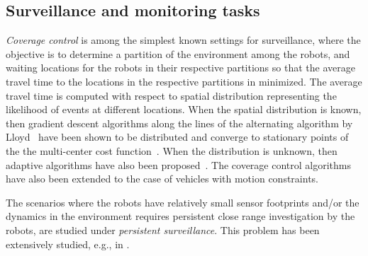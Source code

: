 \subsection{Surveillance and monitoring tasks}
\emph{Coverage control} is among the simplest known settings for surveillance, where the objective is to determine a partition of the environment among the robots, and waiting locations for the robots in their respective partitions so that the average travel time to the locations in the respective partitions in minimized. The average travel time is computed with respect to spatial distribution representing the likelihood of events at different locations. When the spatial distribution is known, then gradient descent algorithms along the lines of the alternating algorithm by Lloyd~\cite{Lloyd:82} have been shown to be distributed and converge to stationary points of the the multi-center cost function~\cite{cortes04}. When the distribution is unknown, then adaptive algorithms have also been proposed~\cite{Arsie.Savla.ea:TAC09,Schwager:2009fz}. The coverage control algorithms have also been extended to the case of vehicles with motion constraints. 

The scenarios where the robots have relatively small sensor footprints and/or the dynamics in the environment requires persistent close range investigation by the robots, are studied under  \emph{persistent surveillance}. This problem has been extensively studied, e.g., in \cite{Huynh.Enright.ea:10,Smith.Schwager.ea:11,Smith.Schwager.ea:12,Enright.Frazzoli:12,Yu.Schwager.ea:14}.



